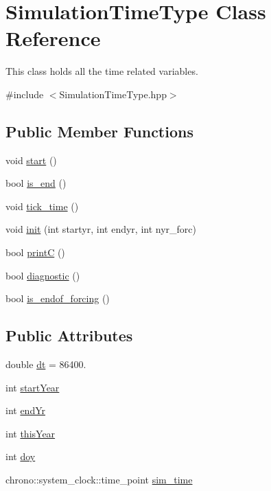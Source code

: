 \hypertarget{class_simulation_time_type}{}\section{Simulation\+Time\+Type Class Reference}
\label{class_simulation_time_type}


This class holds all the time related variables.  




{\ttfamily \#include $<$Simulation\+Time\+Type.\+hpp$>$}

\subsection*{Public Member Functions}
\begin{DoxyCompactItemize}
\item 
void \mbox{\hyperlink{class_simulation_time_type_a271e291f8da1ae72337d456ce3899f3c}{start}} ()
\item 
bool \mbox{\hyperlink{class_simulation_time_type_a9bd3924c0990cef013132553c30eb844}{is\+\_\+end}} ()
\item 
void \mbox{\hyperlink{class_simulation_time_type_a5a0171330f407e1293c6fdf489055278}{tick\+\_\+time}} ()
\item 
void \mbox{\hyperlink{class_simulation_time_type_aa657511a4786bfd2778ce33fbaf5e3b8}{init}} (int startyr, int endyr, int nyr\+\_\+forc)
\item 
bool \mbox{\hyperlink{class_simulation_time_type_a56b971d5c4f04df090fcc7ce9764f5b9}{printC}} ()
\item 
bool \mbox{\hyperlink{class_simulation_time_type_a5ae58a97a898a812bcd24cf83ac5f6ea}{diagnostic}} ()
\item 
bool \mbox{\hyperlink{class_simulation_time_type_a3a35775fa077823a5849b288ae70d196}{is\+\_\+endof\+\_\+forcing}} ()
\end{DoxyCompactItemize}
\subsection*{Public Attributes}
\begin{DoxyCompactItemize}
\item 
double \mbox{\hyperlink{class_simulation_time_type_a47d3b95a336cd5be9672c48237301d4f}{dt}} = 86400.
\item 
int \mbox{\hyperlink{class_simulation_time_type_aaa632d7b7d9a2373e0e0fa8fffbbe122}{start\+Year}}
\item 
int \mbox{\hyperlink{class_simulation_time_type_af6197accafaf26492d16804698769660}{end\+Yr}}
\item 
int \mbox{\hyperlink{class_simulation_time_type_a1cd46f2a7b6924dec7aa98832a881c4e}{this\+Year}}
\item 
int \mbox{\hyperlink{class_simulation_time_type_a23da42b319f90f8ce0ea36f8c76946a5}{doy}}
\item 
chrono\+::system\+\_\+clock\+::time\+\_\+point \mbox{\hyperlink{class_simulation_time_type_a59eef0a521b5637639701bd7ad4fe73e}{sim\+\_\+time}}
\end{DoxyCompactItemize}


